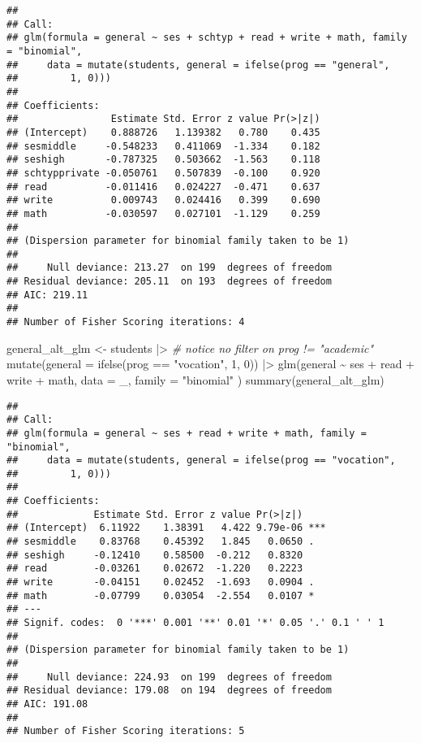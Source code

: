 \documentclass[
  oneside]{book}
\newenvironment{Shaded}{\begin{snugshade}}{\end{snugshade}}
\newcommand{\AttributeTok}[1]{\textcolor[rgb]{0.77,0.63,0.00}{#1}}
\newcommand{\CommentTok}[1]{\textcolor[rgb]{0.56,0.35,0.01}{\textit{#1}}}
\newcommand{\DecValTok}[1]{\textcolor[rgb]{0.00,0.00,0.81}{#1}}
\newcommand{\FunctionTok}[1]{\textcolor[rgb]{0.00,0.00,0.00}{#1}}
\newcommand{\NormalTok}[1]{#1}
\newcommand{\OtherTok}[1]{\textcolor[rgb]{0.56,0.35,0.01}{#1}}
\newcommand{\SpecialCharTok}[1]{\textcolor[rgb]{0.00,0.00,0.00}{#1}}
\newcommand{\StringTok}[1]{\textcolor[rgb]{0.31,0.60,0.02}{#1}}
\begin{document}
\begin{verbatim}
## 
## Call:
## glm(formula = general ~ ses + schtyp + read + write + math, family = "binomial", 
##     data = mutate(students, general = ifelse(prog == "general", 
##         1, 0)))
## 
## Coefficients:
##                Estimate Std. Error z value Pr(>|z|)
## (Intercept)    0.888726   1.139382   0.780    0.435
## sesmiddle     -0.548233   0.411069  -1.334    0.182
## seshigh       -0.787325   0.503662  -1.563    0.118
## schtypprivate -0.050761   0.507839  -0.100    0.920
## read          -0.011416   0.024227  -0.471    0.637
## write          0.009743   0.024416   0.399    0.690
## math          -0.030597   0.027101  -1.129    0.259
## 
## (Dispersion parameter for binomial family taken to be 1)
## 
##     Null deviance: 213.27  on 199  degrees of freedom
## Residual deviance: 205.11  on 193  degrees of freedom
## AIC: 219.11
## 
## Number of Fisher Scoring iterations: 4
\end{verbatim}

\begin{Shaded}
\begin{Highlighting}[]
\NormalTok{general\_alt\_glm }\OtherTok{\textless{}{-}}\NormalTok{ students }\SpecialCharTok{|\textgreater{}} \CommentTok{\# notice no filter on prog != "academic"}
  \FunctionTok{mutate}\NormalTok{(}\AttributeTok{general =} \FunctionTok{ifelse}\NormalTok{(prog }\SpecialCharTok{==} \StringTok{"vocation"}\NormalTok{, }\DecValTok{1}\NormalTok{, }\DecValTok{0}\NormalTok{)) }\SpecialCharTok{|\textgreater{}}
  \FunctionTok{glm}\NormalTok{(general }\SpecialCharTok{\textasciitilde{}}\NormalTok{ ses }\SpecialCharTok{+}\NormalTok{ read }\SpecialCharTok{+}\NormalTok{ write }\SpecialCharTok{+}\NormalTok{ math,}
    \AttributeTok{data =}\NormalTok{ \_, }\AttributeTok{family =} \StringTok{"binomial"}
\NormalTok{  )}
\FunctionTok{summary}\NormalTok{(general\_alt\_glm)}
\end{Highlighting}
\end{Shaded}

\begin{verbatim}
## 
## Call:
## glm(formula = general ~ ses + read + write + math, family = "binomial", 
##     data = mutate(students, general = ifelse(prog == "vocation", 
##         1, 0)))
## 
## Coefficients:
##             Estimate Std. Error z value Pr(>|z|)    
## (Intercept)  6.11922    1.38391   4.422 9.79e-06 ***
## sesmiddle    0.83768    0.45392   1.845   0.0650 .  
## seshigh     -0.12410    0.58500  -0.212   0.8320    
## read        -0.03261    0.02672  -1.220   0.2223    
## write       -0.04151    0.02452  -1.693   0.0904 .  
## math        -0.07799    0.03054  -2.554   0.0107 *  
## ---
## Signif. codes:  0 '***' 0.001 '**' 0.01 '*' 0.05 '.' 0.1 ' ' 1
## 
## (Dispersion parameter for binomial family taken to be 1)
## 
##     Null deviance: 224.93  on 199  degrees of freedom
## Residual deviance: 179.08  on 194  degrees of freedom
## AIC: 191.08
## 
## Number of Fisher Scoring iterations: 5
\end{verbatim}
\end{document}
